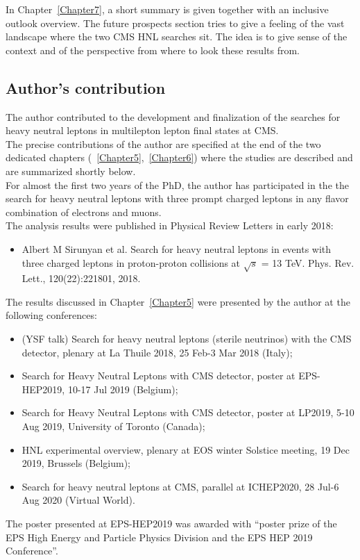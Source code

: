 In Chapter~\ref{Chapter7}, a short summary is given together with an
inclusive outlook overview. The future prospects section tries to give a feeling of the vast landscape
where the two CMS HNL searches sit. The idea is to give sense of the
context and of the perspective from where to look these results
from.

\subsection*{Author's contribution}

The author contributed to the development and finalization of the
searches for heavy neutral leptons in multilepton lepton final
states at CMS.\\
The precise contributions of the author are specified at
the end of the two dedicated chapters
(~\ref{Chapter5},~\ref{Chapter6}) where the studies are described
and are summarized shortly below.\\

For almost the first two years of the PhD, the author
has participated in the the search for heavy neutral leptons with three
prompt charged leptons in any flavor combination of electrons and
muons. \\
The analysis
results were published in Physical Review Letters in early 2018:
\begin{itemize}
\setlength\itemsep{-0.1em}
\item Albert M Sirunyan et al. Search for heavy neutral leptons in events with three charged leptons
in proton-proton collisions at $\sqrt{s}$ = 13 TeV. Phys. Rev. Lett., 120(22):221801, 2018.
\end{itemize}

The results discussed in Chapter~\ref{Chapter5} were presented by the author at the following
conferences:
\begin{itemize}
\setlength\itemsep{-0.1em}
\item (YSF talk) Search for heavy neutral leptons (sterile
  neutrinos) with the CMS detector, plenary at La Thuile 2018, 25
  Feb-3 Mar 2018 (Italy);
\item Search for Heavy Neutral Leptons with CMS detector, poster at
  EPS-HEP2019, 10-17 Jul 2019 (Belgium);
\item Search for Heavy Neutral Leptons with CMS detector, poster at
  LP2019, 5-10 Aug 2019, University of Toronto (Canada);
\item HNL experimental overview, plenary at EOS winter Solstice
  meeting, 19 Dec 2019, Brussels (Belgium);
\item  Search for heavy neutral leptons at CMS, parallel at
  ICHEP2020, 28 Jul-6 Aug 2020 (Virtual World).
\end{itemize}
The poster presented at EPS-HEP2019 was awarded with ``poster prize of
the EPS High Energy and Particle Physics Division and the EPS HEP 2019
Conference''.\\
 
